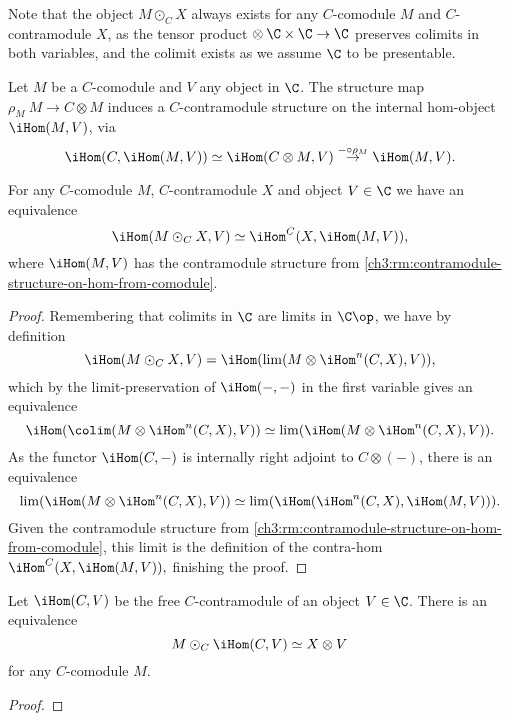 \begin{remark}
    Note that the object $M\odot_C X$ always exists for any $C$-comodule $M$ and $C$-contramodule $X$, as the tensor product $\otimes \: \C\times \C\to \C$ preserves colimits in both variables, and the colimit exists as we assume $\C$ to be presentable.  
\end{remark}

\begin{remark}
    Let $M$ be a $C$-comodule and $V$ any object in $\C$. The structure map $\rho_M\: M\to C\otimes M$ induces a $C$-contramodule structure on the internal hom-object $\iHom(M, V)$, via 
    \[\iHom(C, \iHom(M, V))\simeq \iHom(C\otimes M, V)\overset{-\circ \rho_M}\to \iHom(M, V).\]
\end{remark}


\begin{proposition}
    For any $C$-comodule $M$, $C$-contramodule $X$ and object $V\in \C$ we have an equivalence
    \[\iHom(M\odot_C X, V)\simeq \iHom^C(X, \iHom(M, V)),\]
    where $\iHom(M, V)$ has the contramodule structure from \cref{ch3:rm:contramodule-structure-on-hom-from-comodule}. 
\end{proposition}
\begin{proof}
    Remembering that colimits in $\C$ are limits in $\C\op$, we have by definition 
    \[\iHom(M\odot_C X, V) = \iHom(\lim(M\otimes \iHom^n(C, X), V)),\]
    which by the limit-preservation of $\iHom(-,-)$ in the first variable gives an equivalence
    \[\iHom(\colim(M\otimes \iHom^n(C, X), V))\simeq \lim (\iHom(M\otimes \iHom^n(C, X), V)).\]
    As the functor $\iHom(C, -)$ is internally right adjoint to $C\otimes (-)$, there is an equivalence 
    \[\lim (\iHom(M\otimes \iHom^n(C, X), V)) \simeq \lim(\iHom(\iHom^n(C, X), \iHom(M, V))).\] 
    Given the contramodule structure from \cref{ch3:rm:contramodule-structure-on-hom-from-comodule}, this limit is the definition of the contra-hom $\iHom^C(X, \iHom(M, V)),$
    finishing the proof. 
\end{proof}


\begin{lemma}
    Let $\iHom(C, V)$ be the free $C$-contramodule of an object $V\in \C$. There is an equivalence 
    \[M\odot_C \iHom(C, V)\simeq X\otimes V\]
    for any $C$-comodule $M$. 
\end{lemma}
\begin{proof}
    
\end{proof}


